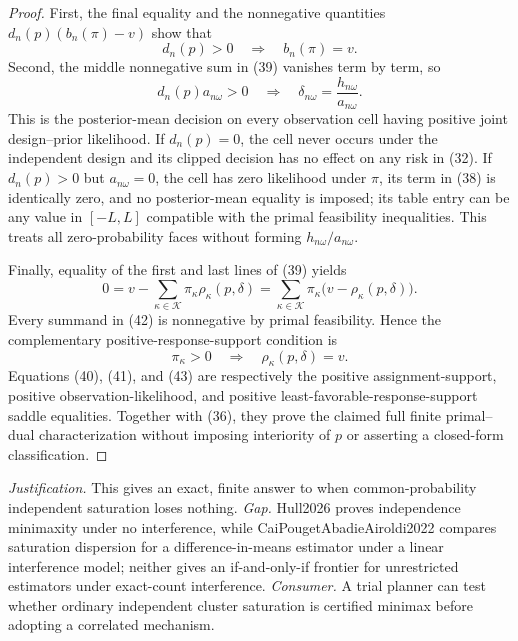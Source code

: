 \documentclass{article}
\begin{document}
\begin{proof}
First, the final equality and the nonnegative quantities \(d_n(p)(b_n(\pi)-v)\) show that
\[
 d_n(p)>0\quad\Longrightarrow\quad b_n(\pi)=v.                            \tag{40}
\]
Second, the middle nonnegative sum in (39) vanishes term by term, so
\[
 d_n(p)a_{n\omega}>0
 \quad\Longrightarrow\quad
 \delta_{n\omega}=\frac{h_{n\omega}}{a_{n\omega}}.                       \tag{41}
\]
This is the posterior-mean decision on every observation cell having positive joint design--prior likelihood.  If \(d_n(p)=0\), the cell never occurs under the independent design and its clipped decision has no effect on any risk in (32).  If \(d_n(p)>0\) but \(a_{n\omega}=0\), the cell has zero likelihood under \(\pi\), its term in (38) is identically zero, and no posterior-mean equality is imposed; its table entry can be any value in \([-L,L]\) compatible with the primal feasibility inequalities.  This treats all zero-probability faces without forming \(h_{n\omega}/a_{n\omega}\).

Finally, equality of the first and last lines of (39) yields
\[
 0=v-\sum_{\kappa\in\mathcal K}\pi_\kappa\rho_\kappa(p,\delta)
   =\sum_{\kappa\in\mathcal K}\pi_\kappa
        \bigl(v-\rho_\kappa(p,\delta)\bigr).                              \tag{42}
\]
Every summand in (42) is nonnegative by primal feasibility.  Hence the complementary positive-response-support condition is
\[
 \pi_\kappa>0
 \quad\Longrightarrow\quad
 \rho_\kappa(p,\delta)=v.                                                  \tag{43}
\]
Equations (40), (41), and (43) are respectively the positive assignment-support, positive observation-likelihood, and positive least-favorable-response-support saddle equalities.  Together with (36), they prove the claimed full finite primal--dual characterization without imposing interiority of \(p\) or asserting a closed-form classification.
\end{proof}
\par\smallskip\noindent \textit{Justification.} This gives an exact, finite answer to when common-probability independent saturation loses nothing. \textit{Gap.} Hull2026 proves independence minimaxity under no interference, while CaiPougetAbadieAiroldi2022 compares saturation dispersion for a difference-in-means estimator under a linear interference model; neither gives an if-and-only-if frontier for unrestricted estimators under exact-count interference. \textit{Consumer.} A trial planner can test whether ordinary independent cluster saturation is certified minimax before adopting a correlated mechanism.
\end{document}
